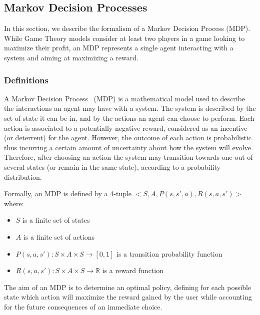 \subsection{Markov Decision Processes}
In this section, we describe the formalism of a Markov Decision Process (MDP).
While Game Theory models consider at least two players in a game looking to maximize their profit, an MDP represents a single agent interacting with a system and aiming at maximizing a reward. 

\subsubsection{Definitions}
A Markov Decision Process~\cite{bellman1957} (MDP) is a mathematical model used to describe the interactions  an agent may have with a system.
The system is described by the set of state it can be in, and by the actions an agent can choose to perform.
Each action is associated to a potentially negative reward, considered as an incentive (or deterrent) for the agent.
However, the outcome of each action is probabilistic thus incurring a certain amount of uncertainty about how the system will evolve.
Therefore, after choosing an action the system may transition towards one out of several states (or remain in the same state), according to a probability distribution.


Formally, an MDP is defined by a 4-tuple $<S,A,P(s,s',a),R(s,a,s')>$ where:
\begin{itemize}
    \item $S$ is a finite set of states
    \item $A$ is a finite set of actions
    \item $P(s,a,s') : S \times A \times S \longrightarrow [0,1]$ is a transition probability function
    \item $R(s,a,s') : S \times A \times S \longrightarrow \mathbb{R}$ is a reward function
\end{itemize}

The aim of an MDP is to determine an optimal policy, defining for each possible state which action will maximize the reward gained by the user while accounting for the future consequences of an immediate choice.

